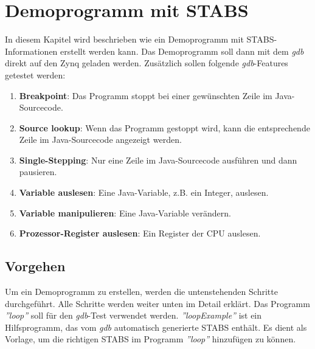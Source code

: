 \section{Demoprogramm mit STABS}
\label{section:demoprogrammSTABS}
In diesem Kapitel wird beschrieben wie ein Demoprogramm mit STABS-Informationen erstellt werden kann.
Das Demoprogramm soll dann mit dem \textit{gdb} direkt auf den Zynq geladen werden.
Zusätzlich sollen folgende \textit{gdb}-Features getestet werden:\\
\begin{enumerate}
	\item \textbf{Breakpoint}: Das Programm stoppt bei einer gewünschten Zeile im Java-Sourcecode.
	\item \textbf{Source lookup}: Wenn das Programm gestoppt wird, kann die entsprechende Zeile im Java-Sourcecode angezeigt werden.
	\item \textbf{Single-Stepping}: Nur eine Zeile im Java-Sourcecode ausführen und dann pausieren.
	\item \textbf{Variable auslesen}: Eine Java-Variable, z.B. ein Integer, auslesen.
	\item \textbf{Variable manipulieren}: Eine Java-Variable verändern.
	\item \textbf{Prozessor-Register auslesen}: Ein Register der CPU auslesen.
\end{enumerate}


\subsection{Vorgehen}
Um ein Demoprogramm zu erstellen, werden die untenstehenden Schritte durchgeführt.
Alle Schritte werden weiter unten im Detail erklärt.
Das Programm \textit{''loop''} soll für den \textit{gdb}-Test verwendet werden.
\textit{''loopExample''} ist ein Hilfsprogramm, das vom \textit{gdb} automatisch generierte STABS enthält.
Es dient als Vorlage, um die richtigen STABS im Programm \textit{''loop''} hinzufügen zu können.

